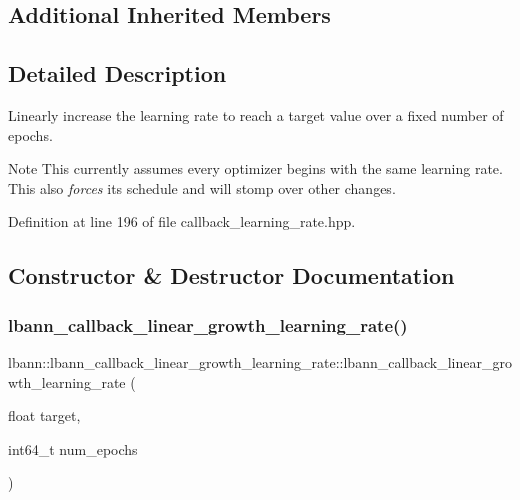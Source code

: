 \subsection*{Additional Inherited Members}


\subsection{Detailed Description}
Linearly increase the learning rate to reach a target value over a fixed number of epochs. \begin{DoxyNote}{Note}
This currently assumes every optimizer begins with the same learning rate. This also {\itshape forces} its schedule and will stomp over other changes. 
\end{DoxyNote}


Definition at line 196 of file callback\+\_\+learning\+\_\+rate.\+hpp.



\subsection{Constructor \& Destructor Documentation}
\mbox{\label{classlbann_1_1lbann__callback__linear__growth__learning__rate_a9eb24d8032af168a0eeec7e385909d55}} 
\subsubsection{\texorpdfstring{lbann\+\_\+callback\+\_\+linear\+\_\+growth\+\_\+learning\+\_\+rate()}{lbann\_callback\_linear\_growth\_learning\_rate()}\hspace{0.1cm}{\footnotesize\ttfamily [1/4]}}
{\footnotesize\ttfamily lbann\+::lbann\+\_\+callback\+\_\+linear\+\_\+growth\+\_\+learning\+\_\+rate\+::lbann\+\_\+callback\+\_\+linear\+\_\+growth\+\_\+learning\+\_\+rate (\begin{DoxyParamCaption}\item[{float}]{target,  }\item[{int64\+\_\+t}]{num\+\_\+epochs }\end{DoxyParamCaption})}

